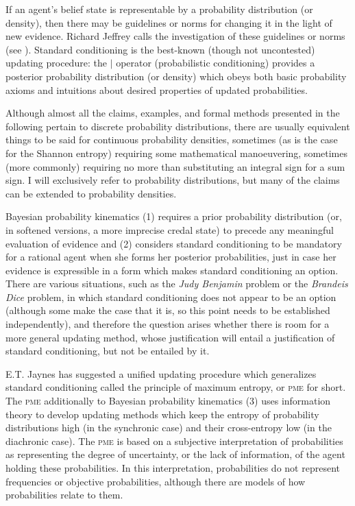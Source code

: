 \documentclass[11pt]{article}
\begin{document}
If an agent's belief state is representable by a probability
distribution (or density), then there may be guidelines or norms for
changing it in the light of new evidence. Richard Jeffrey calls the
investigation of these guidelines or norms  (see ). Standard conditioning is
the best-known (though not uncontested) updating procedure: the $\mid$
operator (probabilistic conditioning) provides a posterior probability
distribution (or density) which obeys both basic probability axioms
and intuitions about desired properties of updated probabilities.

Although almost all the claims, examples, and formal methods presented
in the following pertain to discrete probability distributions, there
are usually equivalent things to be said for continuous probability
densities, sometimes (as is the case for the Shannon entropy)
requiring some mathematical manoeuvering, sometimes (more commonly)
requiring no more than substituting an integral sign for a sum sign.
I will exclusively refer to probability distributions, but many of the
claims can be extended to probability densities.

Bayesian probability kinematics (1) requires a prior probability
distribution (or, in softened versions, a more imprecise credal state)
to precede any meaningful evaluation of evidence and (2) considers
standard conditioning to be mandatory for a rational agent when she
forms her posterior probabilities, just in case her evidence is
expressible in a form which makes standard conditioning an option.
There are various situations, such as the \emph{Judy Benjamin} problem
or the \emph{Brandeis Dice} problem, in which standard conditioning
does not appear to be an option (although some make the case that it
is, so this point needs to be established independently), and
therefore the question arises whether there is room for a more general
updating method, whose justification will entail a justification of
standard conditioning, but not be entailed by it.

E.T. Jaynes has suggested a unified updating procedure which
generalizes standard conditioning called the principle of maximum
entropy, or \textsc{pme} for short. The \textsc{pme} additionally to
Bayesian probability kinematics (3) uses information theory to develop
updating methods which keep the entropy of probability distributions
high (in the synchronic case) and their cross-entropy low (in the
diachronic case). The \textsc{pme} is based on a subjective
interpretation of probabilities as representing the degree of
uncertainty, or the lack of information, of the agent holding these
probabilities. In this interpretation, probabilities do not represent
frequencies or objective probabilities, although there are models of
how probabilities relate to them.
\end{document}
